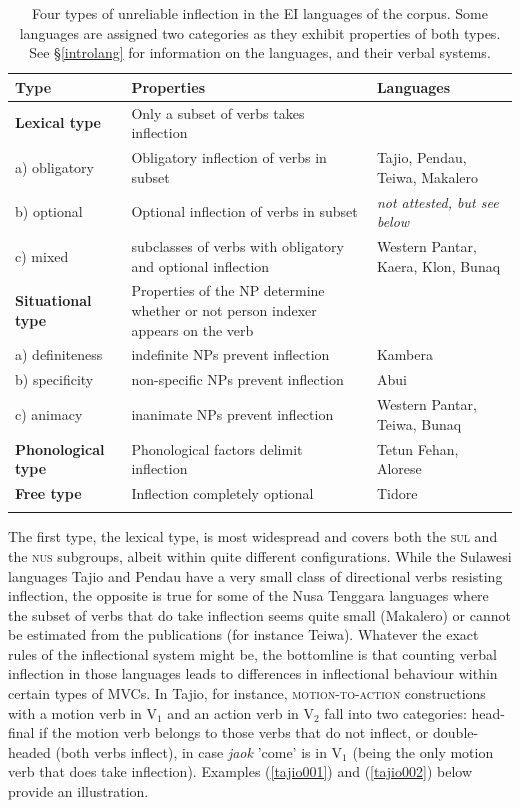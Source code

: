 \begin{table}
\begin{tabular}{l L{5cm} R{3cm}}
  \lsptoprule
Type & Properties & Languages \tabularnewline 
  \hline
\textbf{Lexical type} & Only a subset of verbs takes inflection &  \tabularnewline
a) obligatory & Obligatory inflection of verbs in subset & Tajio, Pendau, Teiwa, Makalero \tabularnewline
b) optional & Optional inflection of verbs in subset & \textit{not attested, but see below} \tabularnewline
c) mixed & subclasses of verbs with obligatory and optional inflection & Western Pantar, Kaera, Klon, Bunaq \tabularnewline
\hline
\textbf{Situational type} & Properties of the NP determine whether or not person indexer appears on the verb & \tabularnewline
a) definiteness & indefinite NPs prevent inflection & Kambera \tabularnewline
b) specificity & non-specific NPs prevent inflection & Abui \tabularnewline
c) animacy & inanimate NPs prevent inflection & Western Pantar, Teiwa, Bunaq \tabularnewline
\hline
\textbf{Phonological type} & Phonological factors delimit inflection & Tetun Fehan, Alorese \tabularnewline
\hline
\textbf{Free type} & Inflection completely optional & Tidore \tabularnewline
   \lspbottomrule
\end{tabular}
\caption[Types of unreliable inflection in EI languages]{Four types of unreliable inflection in the EI languages of the corpus. Some languages are assigned two categories as they exhibit properties of both types. See §\ref{introlang} for information on the languages, and their verbal systems.}
\label{table:unreliable}
\end{table}

The first type, the lexical type, is most widespread and covers both the \textsc{sul} and the \textsc{nus} subgroups, albeit within quite different configurations. While the Sulawesi languages Tajio and Pendau have a very small class of directional verbs resisting inflection, the opposite is true for some of the Nusa Tenggara languages where the subset of verbs that do take inflection seems quite small (Makalero) or cannot be estimated from the publications (for instance Teiwa). Whatever the exact rules of the inflectional system might be, the bottomline is that counting verbal inflection in those languages leads to differences in inflectional behaviour within certain types of MVCs. In Tajio, for instance, \textsc{motion-to-action} constructions with a motion verb in V$_1$ and an action verb in V$_2$  fall into two categories: head-final if the motion verb belongs to those verbs that do not inflect, or double-headed (both verbs inflect), in case \textit{jaok} 'come' is in V$_1$ (being the only motion verb that does take inflection). Examples (\ref{tajio001}) and (\ref{tajio002}) below provide an illustration.

